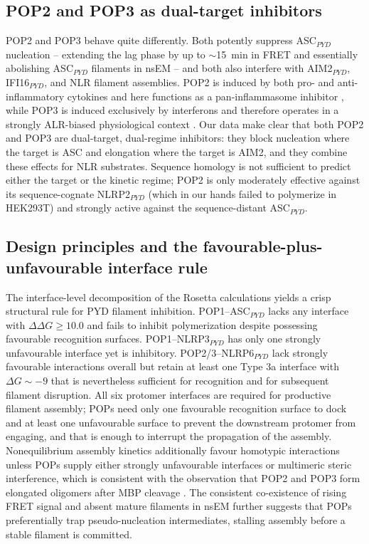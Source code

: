 \documentclass[11pt]{article}
\begin{document}
\subsection{POP2 and POP3 as dual-target inhibitors}

POP2 and POP3 behave quite differently. Both potently suppress
ASC$_{PYD}$ nucleation -- extending the lag phase by up to $\sim$15~min
in FRET and essentially abolishing ASC$_{PYD}$ filaments in nsEM -- and
both also interfere with AIM2$_{PYD}$, IFI16$_{PYD}$, and NLR filament
assemblies. POP2 is induced by both pro- and anti-inflammatory cytokines
and here functions as a pan-inflammasome inhibitor
\citep{periasamy2017pop2, ratsimandresy2017pop2}, while POP3 is induced
exclusively by interferons and therefore operates in a strongly
ALR-biased physiological context \citep{khare2014pop3}. Our data make
clear that both POP2 and POP3 are dual-target, dual-regime inhibitors:
they block nucleation where the target is ASC and elongation where the
target is AIM2, and they combine these effects for NLR substrates.
Sequence homology is not sufficient to predict either the target or the
kinetic regime; POP2 is only moderately effective against its
sequence-cognate NLRP2$_{PYD}$ (which in our hands failed to polymerize
in HEK293T) and strongly active against the sequence-distant
ASC$_{PYD}$.

\subsection{Design principles and the favourable-plus-unfavourable
interface rule}

The interface-level decomposition of the Rosetta calculations yields a
crisp structural rule for PYD filament inhibition. POP1--ASC$_{PYD}$
lacks any interface with $\Delta\Delta G \geq 10.0$ and fails to inhibit
polymerization despite possessing favourable recognition surfaces.
POP1--NLRP3$_{PYD}$ has only one strongly unfavourable interface yet is
inhibitory. POP2/3--NLRP6$_{PYD}$ lack strongly favourable interactions
overall but retain at least one Type 3a interface with $\Delta G \sim -9$
that is nevertheless sufficient for recognition and for subsequent
filament disruption. All six protomer interfaces are required for
productive filament assembly; POPs need only one favourable recognition
surface to dock and at least one unfavourable surface to prevent the
downstream protomer from engaging, and that is enough to interrupt the
propagation of the assembly. Nonequilibrium assembly kinetics
additionally favour homotypic interactions unless POPs supply either
strongly unfavourable interfaces or multimeric steric interference, which
is consistent with the observation that POP2 and POP3 form elongated
oligomers after MBP cleavage \citep{mazanek2019fret}. The consistent
co-existence of rising FRET signal and absent mature filaments in nsEM
further suggests that POPs preferentially trap pseudo-nucleation
intermediates, stalling assembly before a stable filament is committed.
\end{document}
